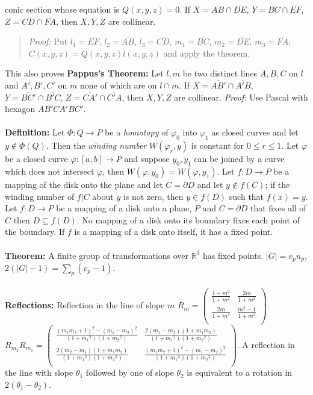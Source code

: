 conic section whose equation is $Q(x,y,z)=0$.  If 
$X= {\overline {AB}} \cap  {\overline {DE}}$,
$Y= {\overline {BC}} \cap  {\overline {EF}}$,
$Z= {\overline {CD}} \cap  {\overline {FA}}$, then $X, Y, Z$ are collinear.  
\begin{quote}
\emph{Proof:}
Put
$l_1 = {\overline {EF}}$,
$l_2 = {\overline {AB}}$,
$l_3 = {\overline {CD}}$,
$m_1 = {\overline {BC}}$,
$m_2 = {\overline {DE}}$,
$m_3 = {\overline {FA}}$, $C(x,y,z)= Q(x,y,z)l(x,y,z)$ and apply the theorem. 
\end{quote}
This also proves {\bf Pappus's Theorem:} Let $l, m$ be two distinct lines $A,B,C$ on $l$ and
$A', B', C'$ on $m$ none of which are on $l \cap m$.  If
$X= {\overline {AB'}} \cap  {\overline {A' B}}$,
$Y= {\overline {BC'}} \cap  {\overline {B'C}}$,
$Z= {\overline {CA'}} \cap  {\overline {C'A}}$, then $X, Y, Z$ are collinear.  \emph{Proof:}
Use Pascal with hexagon $AB'CA'BC'$.
\\
\\
{\bf Definition:}
Let $\Phi: Q \rightarrow P$ be a \emph{homotopy} of $\varphi_0$ into $\varphi_1$ as closed
curves and let $y \notin \Phi(Q)$.  Then the \emph{winding number}
$W(\varphi_r, y)$ is constant
for $0 \le r \le 1$.  Let $\varphi$ be a closed curve $\varphi: [a,b] \rightarrow P$ and
suppose $y_0 , y_1$ can be joined by a curve which does not intersect $\varphi$, then
$W(\varphi, y_0 )= W(\varphi , y_1)$.  Let $f: D \rightarrow P$ be a mapping of
the disk onto the plane and let $C= \partial D$ and let $y \notin f(C)$;
if the winding number
of $f|C$ about $y$ is not zero, then $y \in f(D)$ such that $f(x)=y$.
Let $f: D \rightarrow P$ be a mapping of a disk onto a plane, $P$ and $C= \partial D$
that fixes all of $C$ then $D \subseteq f(D)$.  No mapping of a disk onto its boundary
fixes each point of the boundary.  If $f$ is a mapping of a disk onto itself, it has
a fixed point. 
\\
\\
{\bf Theorem:}
A finite group of transformations over ${\mathbb R}^3$ has fixed points. $|G|= v_p n_p$,
$2(|G| -1) = \sum_p (v_p - 1)$.
\\
\\
{\bf Reflections:}  Reflection in the line of slope $m$
$R_m = 
\left(
\begin{array}{cc}
{\frac {1 - m^2} {1+m^2}} & {\frac {2 m} {1+m^2}} \\
{\frac {2 m} {1+m^2}} & {\frac {m^2 - 1} {1+m^2}} \\
\end{array}
\right)$. \\
$R_{m_2} R_{m_1} = 
\left(
\begin{array}{cc}
{\frac {(m_1 m_2 +1)^2 - (m_1 - m_2)^2} {(1+{m_1}^2) (1+{m_2}^2)}} & 
{\frac {2(m_1 - m_2 )(1+ m_1 m_2)} {(1+{m_1}^2) (1+{m_2}^2)}}  \\
{\frac {2(m_2 - m_1 )(1+ m_1 m_2)} {(1+{m_1}^2) (1+{m_2}^2)}} &
{\frac {(m_1 m_2 +1)^2 - (m_1 - m_2)^2} {(1+{m_1}^2) (1+{m_2}^2)}} \\
\end{array}
\right)$.  A reflection in the line with slope ${\theta_1}$ followed by one of slope ${\theta_2}$ is
equivalent to a rotation in $2(\theta_1 - \theta_2)$.
